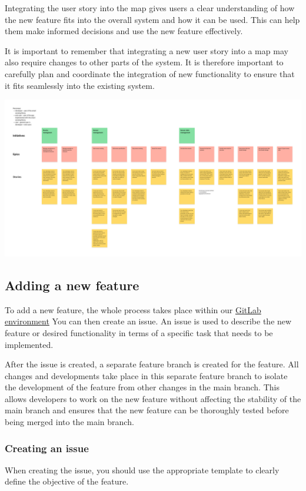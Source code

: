 \documentclass[12pt]{article}
\newcounter{fr}
\begin{document}
Integrating the user story into the map gives users a clear understanding of how the new feature fits into the overall system and how it can be used. This can help them make informed decisions and use the new feature effectively.

It is important to remember that integrating a new user story into a map may also require changes to other parts of the system. It is therefore important to carefully plan and coordinate the integration of new functionality to ensure that it fits seamlessly into the existing system.

 \includegraphics[width=\textwidth]{user_story_map.png}
 

\subsection{Adding a new feature}

To add a new feature, the whole process takes place within our \href{https://gitlab.uni-ulm.de/se-anwendungsprojekt-22-23}{GitLab environment}
You can then create an issue. An issue is used to describe the new feature or desired functionality in terms of a specific task that needs to be implemented.

After the issue is created, a separate feature branch is created for the feature. All changes and developments take place in this separate feature branch to isolate the development of the feature from other changes in the main branch. This allows developers to work on the new feature without affecting the stability of the main branch and ensures that the new feature can be thoroughly tested before being merged into the main branch.

\subsubsection{Creating an issue}
When creating the issue, you should use the appropriate template to clearly define the objective of the feature. 
\end{document}
